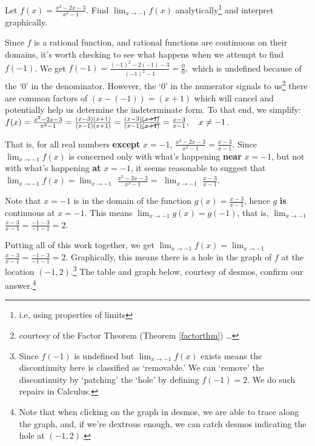 \documentclass{ximera}
\begin{document}
\begin{example} \label{rationallimit}  Let  $f(x) =  \frac{x^2-2x-3}{x^2-1}$.  Find $\lim_{x \rightarrow -1} f(x)$ analytically\footnote{i.e, using properties of limits} and interpret graphically.

\begin{explanation}  Since $f$ is a rational function, and rational functions are continuous on their domains, it's worth checking to see what happens when we attempt to find $f(-1)$.  We get  $f(-1) = \frac{(-1)^2 - 2(-1)-3}{(-1)^2-1} = \frac{0}{0},$ which is undefined because of the `$0$' in the denominator.  However, the `$0$' in the numerator signals to us\footnote{courtesy of the Factor Theorem (Theorem \ref{factorthm}) \ldots} there are common factors of $(x-(-1)) = (x+1)$ which will cancel and potentially help us determine the indeterminate form.  To that end, we simplify: $f(x) =  \frac{x^2-2x-3}{x^2-1} = \frac{(x-3)(x+1)}{(x-1)(x+1)} = \frac{(x-3)\cancel{(x+1)}}{(x-1)\cancel{(x+1)}} = \frac{x-3}{x-1}, \quad x \neq -1$. 



That is, for all real numbers \textbf{except} $x = -1$, $\frac{x^2-2x-3}{x^2-1} = \frac{x-3}{x-1}$.   Since $\lim_{x \rightarrow -1} f(x)$ is concerned only with what's happening \textbf{near} $x = -1$, but not with what's happening \textbf{at} $x = -1$, it seems reasonable to suggest that $\lim_{x \rightarrow -1} f(x) =  \lim_{x \rightarrow -1}$  $\frac{x^2-2x-3}{x^2-1} =$  $\lim_{x \rightarrow -1}$ $\frac{x-3}{x-1}$.

Note that $x = -1$ is in the domain of the function $g(x) = \frac{x-3}{x-1}$, hence $g$  \textbf{is} continuous at $x = -1$.   This means $\lim_{x \rightarrow -1} g(x) = g(-1)$, that is, $\lim_{x \rightarrow -1}$ $\frac{x-3}{x-1} = \frac{-1-3}{-1-1} = 2$.

Putting all of this work together, we get $\lim_{x \rightarrow -1} f(x) =   \lim_{x \rightarrow -1}$ $ \frac{x-3}{x-1}  =  \frac{-1-3}{-1-1} = 2$.   Graphically, this means there is a hole in the graph of $f$ at the location $(-1,2)$.\footnote{Since $f(-1)$ is undefined but  $\lim_{x \rightarrow -1} f(x)$ exists means the discontinuity here is classified as `removable.'  We can `remove' the discontinuity by `patching' the `hole' by defining $f(-1) = 2$. We do such repairs in Calculus.}  The table and graph below, courtesy of desmos, confirm our answer.\footnote{Note that when clicking on the graph in desmos, we are able to trace along the graph, and, if we're dextrous enough, we can catch desmos indicating the hole at $(-1,2)$.}

\begin{center}
\end{center}

\end{explanation}
\end{example}
\end{document}
